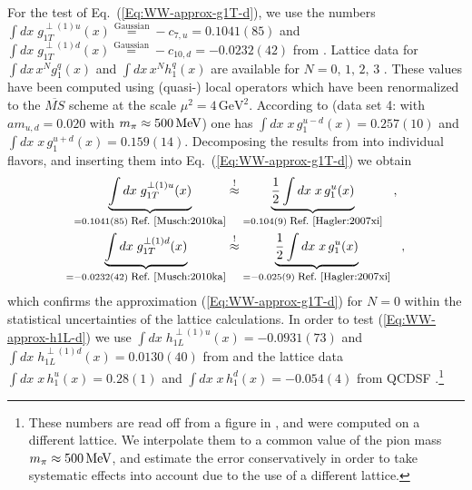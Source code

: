 \documentclass[a4paper,11pt]{article}
\newcommand{\ba}{\begin{eqnarray}}
\newcommand{\ea}{\end{eqnarray}}
\begin{document}
For the test of Eq.~(\ref{Eq:WW-approx-g1T-d}), we use the numbers 
$\int d x\;g_{1T}^{\perp(1)u}(x)\stackrel{\text{Gaussian}}{=}-c_{7,u}= 0.1041(85)$ 
and
$\int d x\;g_{1T}^{\perp(1)d}(x)\stackrel{\text{Gaussian}}{=}-c_{10,d}=-0.0232(42)$
from \cite{Musch:2010ka}. %
Lattice data for
$\int d x \,x^{N}g_1^q(x)$
\cite{Hagler:2003is,Hagler:2007xi} and
$\int d x \,x^{N}h_1^q(x)$
\cite{Gockeler:2005cj} are available for $N=0,\,1,\,2,\,3$ .
These values have been computed using (quasi-) local operators which 
have been renormalized to the $\overline{MS}$ scheme at the scale 
$\mu^2 = 4\,\text{GeV}^2$.
According to \cite{Hagler:2007xi} (data set 4:
with $am_{u,d} = 0.020$ with $m_\pi\approx 500\,{\rm MeV}$)
one has $\int d x \;x\,g_1^{u-d}(x)= 0.257(10)$ and
$\int d x \;x\,g_1^{u+d}(x)= 0.159(14)$.
Decomposing the results from  \cite{Hagler:2007xi} into
individual flavors, and inserting them into
Eq.~(\ref{Eq:WW-approx-g1T-d}) we obtain
\ba
        \underbrace{\int d x\;g_{1T}^{\perp(1)u}(x)}
        _{= 0.1041(85) \;\mbox{\footnotesize Ref.~\cite{Musch:2010ka}}}
        &\stackrel{!}{\approx}
        \underbrace{\frac{1}{2}\int d x\;x\,g_1^u(x)}
        _{= 0.104(9) \;\mbox{\footnotesize Ref.~\cite{Hagler:2007xi}}}
        \hspace{3mm} , \nonumber \\
        \underbrace{\int d x\;g_{1T}^{\perp(1)d}(x)}
        _{= -0.0232(42) \;\mbox{\footnotesize Ref.~\cite{Musch:2010ka}}}
        &\stackrel{!}{\approx}
        \underbrace{\frac{1}{2}\int d x\;x\,g_1^u(x)}
        _{= -0.025(9) \;\mbox{\footnotesize Ref.~\cite{Hagler:2007xi}}}
        \hspace{3mm}, 
        \label{Eq:test-WW-type-lattice-g1T}
\ea
which confirms the approximation (\ref{Eq:WW-approx-g1T-d}) for $N=0$
within the statistical uncertainties of the lattice calculations.
%
In order to test (\ref{Eq:WW-approx-h1L-d}) we use
$\int d x\;h_{1L}^{\perp(1)u}(x) = -0.0931(73)$ and
$\int d x\;h_{1L}^{\perp(1)d}(x) = 0.0130(40)$ from \cite{Hagler:2009mb}
and the lattice data 
$\int d x \;x\,h_1^u(x)= 0.28(1)$ and
$\int d x \;x\,h_1^d(x)= -0.054(4)$
from QCDSF \cite{Gockeler:2005cj}.\footnote{
  These numbers are read off from a figure in \cite{Gockeler:2005cj},
  and were computed on a different lattice. We interpolate them to a
  common value of the pion mass $m_\pi\approx500\,{\rm MeV}$, and
  estimate the error conservatively in order to take systematic effects
  into account due to the use of a different lattice.}
\end{document}
